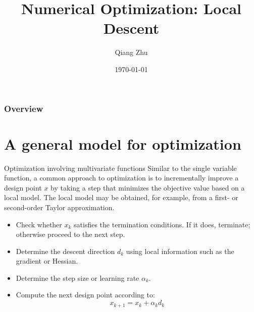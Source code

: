 \documentclass{beamer}
\title[Local Descent]{Numerical Optimization: Local Descent} %
\author{Qiang Zhu} %
\institute[University of Nevada Las Vegas] %
{
University of Nevada Las Vegas\\ %
\medskip
}
\date{\today} %
\begin{document}
\begin{frame}
\titlepage %
\end{frame}

\begin{frame}
\frametitle{Overview} %
\tableofcontents %
\end{frame}



\section{A general model for optimization}
\begin{frame}{Optimization involving multivariate functions}
Similar to the single variable function, a common approach to optimization is to incrementally improve a design point $x$ by taking a step that minimizes the objective value based on a local model. The local model may be obtained, for example, from a first- or second-order Taylor approximation.
\begin{itemize}
    \item Check whether $x_k$ satisfies the termination conditions. If it does, terminate; otherwise proceed to the next step.
    \item Determine the descent direction $d_k$ using local information such as the gradient or Hessian. 
    \item Determine the step size or learning rate $\alpha_k$.
    \item Compute the next design point according to:
    \begin{equation*}
        x_{k+1} = x_k + \alpha_k d_k
    \end{equation*}
\end{itemize}

\end{frame}
\end{document}
